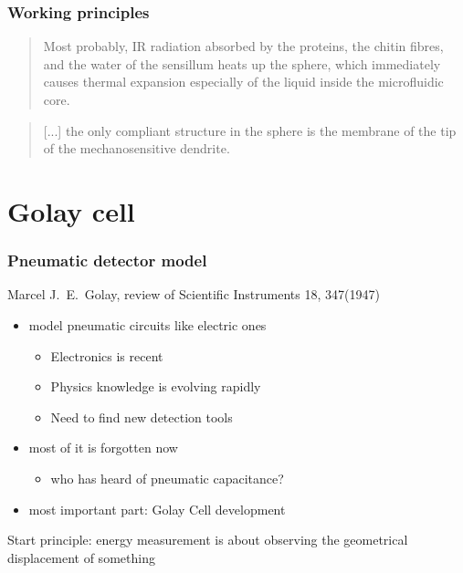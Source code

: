 \documentclass[14pt]{beamer}
\begin{document}
\begin{frame}
\frametitle{Working principles}
\begin{quote}
Most probably, IR radiation absorbed by the proteins, the chitin fibres, and the water of the sensillum heats up the sphere, which immediately causes \alert{thermal expansion} especially of the liquid inside the microfluidic core.
\end{quote}
\begin{quote}
[...] the only \alert{compliant structure} in the sphere is the \alert{membrane} of the tip of the \alert{mechanosensitive dendrite.}
\end{quote}
\end{frame}

\section{Golay cell}

\begin{frame}
\frametitle{Pneumatic detector model}
Marcel J.~E.~Golay, review of Scientific Instruments 18, 347(\alert{1947})
\begin{itemize}
\item model pneumatic circuits like electric ones
\begin{itemize}
\item Electronics is recent
\item Physics knowledge is evolving rapidly
\item Need to find new detection tools
\end{itemize}
\item most of it is forgotten now
\begin{itemize}
\item who has heard of pneumatic capacitance?
\end{itemize}
\item most important part: Golay Cell development
\end{itemize}
Start principle: energy measurement is about observing the geometrical displacement of something
\end{frame}
\end{document}

